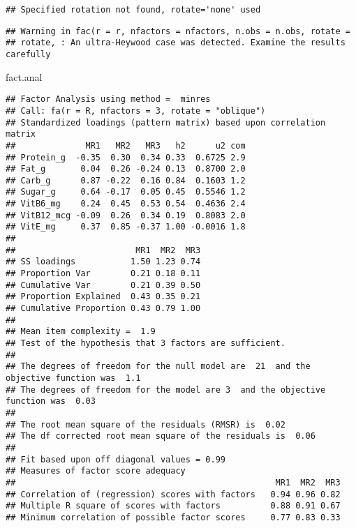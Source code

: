 \documentclass[]{article}
\newenvironment{Shaded}{\begin{snugshade}}{\end{snugshade}}
\newcommand{\OperatorTok}[1]{\textcolor[rgb]{0.81,0.36,0.00}{\textbf{#1}}}
\newcommand{\NormalTok}[1]{#1}
\begin{document}
\begin{verbatim}
## Specified rotation not found, rotate='none' used
\end{verbatim}

\begin{verbatim}
## Warning in fac(r = r, nfactors = nfactors, n.obs = n.obs, rotate =
## rotate, : An ultra-Heywood case was detected. Examine the results carefully
\end{verbatim}

\begin{Shaded}
\begin{Highlighting}[]
\NormalTok{fact.anal}
\end{Highlighting}
\end{Shaded}

\begin{verbatim}
## Factor Analysis using method =  minres
## Call: fa(r = R, nfactors = 3, rotate = "oblique")
## Standardized loadings (pattern matrix) based upon correlation matrix
##              MR1   MR2   MR3   h2      u2 com
## Protein_g  -0.35  0.30  0.34 0.33  0.6725 2.9
## Fat_g       0.04  0.26 -0.24 0.13  0.8700 2.0
## Carb_g      0.87 -0.22  0.16 0.84  0.1603 1.2
## Sugar_g     0.64 -0.17  0.05 0.45  0.5546 1.2
## VitB6_mg    0.24  0.45  0.53 0.54  0.4636 2.4
## VitB12_mcg -0.09  0.26  0.34 0.19  0.8083 2.0
## VitE_mg     0.37  0.85 -0.37 1.00 -0.0016 1.8
## 
##                        MR1  MR2  MR3
## SS loadings           1.50 1.23 0.74
## Proportion Var        0.21 0.18 0.11
## Cumulative Var        0.21 0.39 0.50
## Proportion Explained  0.43 0.35 0.21
## Cumulative Proportion 0.43 0.79 1.00
## 
## Mean item complexity =  1.9
## Test of the hypothesis that 3 factors are sufficient.
## 
## The degrees of freedom for the null model are  21  and the objective function was  1.1
## The degrees of freedom for the model are 3  and the objective function was  0.03 
## 
## The root mean square of the residuals (RMSR) is  0.02 
## The df corrected root mean square of the residuals is  0.06 
## 
## Fit based upon off diagonal values = 0.99
## Measures of factor score adequacy             
##                                                    MR1  MR2  MR3
## Correlation of (regression) scores with factors   0.94 0.96 0.82
## Multiple R square of scores with factors          0.88 0.91 0.67
## Minimum correlation of possible factor scores     0.77 0.83 0.33
\end{verbatim}

\begin{Shaded}
\end{Shaded}
\end{document}
